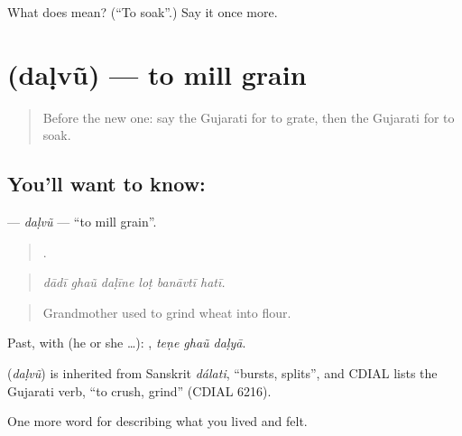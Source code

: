 \begin{tcolorbox}[breakable,colback=teal!4,colframe=teal!35!black,title={Before you move on}]
What does  mean? (\textquotedblleft{}To soak\textquotedblright{}.) Say it once more.
\end{tcolorbox}
\section[\texorpdfstring{\gu{દળવું} (daḷvũ)}{દળવું (daḷvũ)}]{ (daḷvũ) — to mill grain}

\label{lesson:GU-C522-dalvu}



\begin{quote}
Before the new one: say the Gujarati for to grate, then the Gujarati for to soak.
\end{quote}

\subsection*{You'll want to know: }
\textbf{} — \emph{daḷvũ} — \textquotedblleft{}to mill grain\textquotedblright{}.

\begin{quote}
     .
\end{quote}

\begin{quote}
\emph{dādī ghaũ daḷīne loṭ banāvtī hatī.}
\end{quote}

\begin{quote}
Grandmother used to grind wheat into flour.
\end{quote}

Past, with  (he or she …):   , \emph{teṇe ghaũ daḷyā}.

\begin{cousinweb}
\textbf{} (\emph{daḷvũ}) is inherited from Sanskrit \emph{dálati}, \textquotedblleft{}bursts, splits\textquotedblright{}, and CDIAL lists the Gujarati verb, \textquotedblleft{}to crush, grind\textquotedblright{} (CDIAL 6216).
\end{cousinweb}

\begin{grammarlens}[title={What you've built}]
One more word for describing what you lived and felt.
\end{grammarlens}

